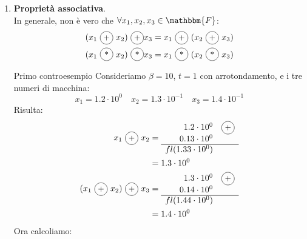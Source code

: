 \documentclass[12pt]{report}
\newcommand{\nmu}{}
\newcommand{\circled}[1]{%
	\begin{tikzpicture}[baseline=(char.base)]
		\node[shape=circle, draw, inner sep=1.2pt, minimum size=1.5em] (char) {\small #1};
	\end{tikzpicture}%
}
\begin{document}
\begin{enumerate}
	\item \textbf{Proprietà associativa}. \\
	In generale, non è vero che $\forall x_1, x_2, x_3 \in \mathbbm{F}$:
	\begin{align*}
		(x_1\ \circled{+}\ x_2)\ \circled{+} x_3 &= x_1\ \circled{+}\ (x_2\ \circled{+}\ x_3) \\
		(x_1\ \circled{*}\ x_2)\ \circled{*} x_3 &= x_1\ \circled{*}\ (x_2\ \circled{*}\ x_3)
	\end{align*}
	\begin{example}{\nmu Primo controesempio}{}
		Consideriamo $\beta = 10$, $t = 1$ con arrotondamento, e i tre numeri di macchina:
		\[
		x_1 = 1.2 \cdot 10^0 \quad x_2 = 1.3 \cdot 10^{-1} \quad x_3 = 1.4 \cdot 10^{-1}
		\]
		Risulta:
		\begin{align*}
		x_1\ \circled{+}\ x_2 &=
		\begin{array}{r@{\quad}l}
			1.2 \cdot 10^0 & \circled{+} \\
			0.13 \cdot 10^0 &  \\
			\hline
			fl(1.33 \cdot 10^0) &
		\end{array} \\
		&= 1.3 \cdot 10^0 \\
		(x_1\ \circled{+}\ x_2)\ \circled{+}\ x_3 &= \begin{array}{r@{\quad}l}
			1.3 \cdot 10^0 & \circled{+} \\
			0.14 \cdot 10^0 &  \\
			\hline
			fl(1.44 \cdot 10^0) &
		\end{array} \\
		&= 1.4 \cdot 10^0
		\end{align*}
		Ora calcoliamo:


\end{example}
\end{enumerate}
\end{document}
